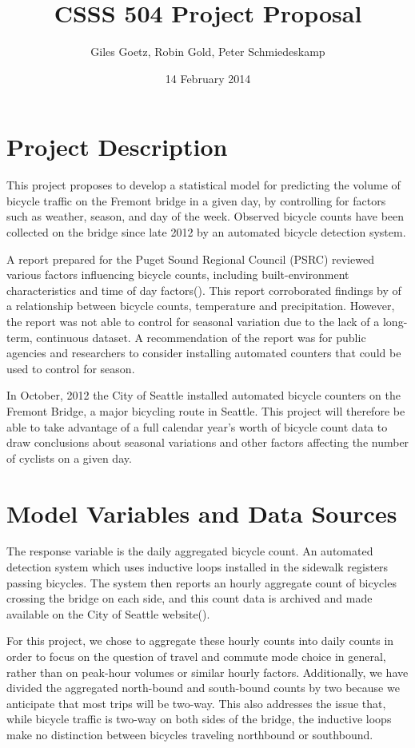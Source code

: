 \documentclass[10pt,letterpaper,article]{memoir} %
\title{CSSS 504 Project Proposal}
\author{Giles Goetz, Robin Gold, Peter Schmiedeskamp}
\date{14 February 2014} %
\begin{document}
\maketitle


\chapter*{Project Description}
This project proposes to develop a statistical model for predicting
the volume of bicycle traffic on the Fremont bridge in a given day, by
controlling for factors such as weather, season, and day of the week.
Observed bicycle counts have been collected on the bridge since late
2012 by an automated bicycle detection
system.

A report prepared for the Puget Sound Regional Council (PSRC) reviewed
various factors influencing bicycle counts, including
built-environment characteristics and time of day
factors(\cite{Bassok:2011aa}). This report corroborated findings by
\textcite{City-of-Vancouver:1999aa,Niemeier:1996aa,Parkin:2008aa} of a
relationship between bicycle counts, temperature and precipitation.
However, the report was not able to control for seasonal variation due
to the lack of a long-term, continuous dataset. A recommendation of
the report was for public agencies and researchers to consider
installing automated counters that could be used to control for
season.

In October, 2012 the City of Seattle installed automated bicycle
counters on the Fremont Bridge, a major bicycling route in Seattle.
This project will therefore be able to take advantage of a full
calendar year's worth of bicycle count data to draw conclusions about
seasonal variations and other factors affecting the number of cyclists
on a given day.

\chapter*{Model Variables and Data Sources}
The response variable is the daily aggregated bicycle count. An
automated detection system which uses inductive loops installed in the
sidewalk registers passing bicycles. The system then reports an hourly
aggregate count of bicycles crossing the bridge on each side, and this
count data is archived and made available on the City of
Seattle website(\cite{City-of-Seattle:aa}).

For this project, we chose to aggregate these hourly counts into daily
counts in order to focus on the question of travel and commute mode
choice in general, rather than on peak-hour volumes or similar hourly
factors. Additionally, we have divided the aggregated north-bound and
south-bound counts by two because we anticipate that most trips will
be two-way. This also addresses the issue that, while bicycle traffic
is two-way on both sides of the bridge, the inductive loops make no
distinction between bicycles traveling northbound or southbound.
\end{document}
